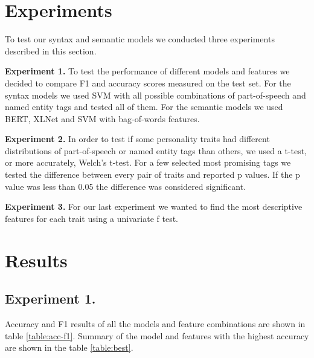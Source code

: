 \documentclass[10pt, a4paper]{article}
\begin{document}
\section{Experiments}
To test our syntax and semantic models we conducted three experiments described in this section.

\textbf{Experiment 1.} To test the performance of different models and features we decided to compare F1 and accuracy scores measured on the test set.
For the syntax models we used SVM with all possible combinations of part-of-speech and named entity tags and tested all of them.
For the semantic models we used BERT, XLNet and SVM with bag-of-words features.

\textbf{Experiment 2.}  In order to test if some personality traits had different distributions of part-of-speech or named entity tags than others, we used a t-test, or more accurately, Welch’s t-test.
For a few selected most promising tags we tested the difference between every pair of traits and reported p values.
If the p value was less than 0.05 the difference was considered significant.

\textbf{Experiment 3.} For our last experiment we wanted to find the most descriptive features for each trait using a univariate f test.

\section{Results}

\subsection{Experiment 1.}
Accuracy and F1 results of all the models and feature combinations are shown in table \ref{table:acc-f1}.
Summary of the model and features with the highest accuracy are shown in the table \ref{table:best}.
\end{document}
